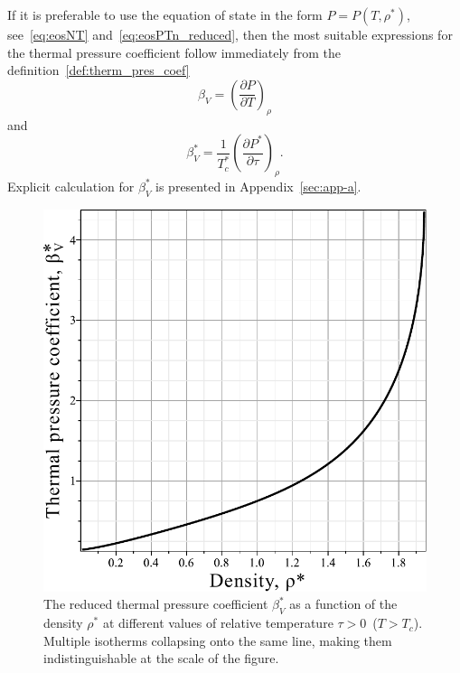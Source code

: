 \documentclass[fleqn,twoside,twocolumn,nofootinbib,showkeys]{revtex4} %
\begin{document}
	If it is preferable to use the equation of state in the form $P=P(T, \rho^*)$, see~\eqref{eq:eosNT} and~\eqref{eq:eosPTn_reduced}, then the most suitable expressions for the thermal pressure coefficient follow immediately from the definition~\eqref{def:therm_pres_coef}
	\begin{equation}
		\beta_V = \left(\frac{\partial P}{\partial T}\right)_\rho
	\end{equation}
	and
	\begin{equation}
		\label{eq:beta_star_n}
		\beta^*_V = \frac{1}{T^*_c} \left(\frac{\partial P^*}{\partial \tau}\right)_{\rho}.
	\end{equation}
	Explicit calculation for $\beta^*_V$ is presented in Appendix~\ref{sec:app-a}.
	
	\begin{figure}[h!] 
		\includegraphics[width=\column]{f3a.pdf}
		\vskip-3mm
		\caption{The reduced thermal pressure coefficient $\beta^*_V$ as a function of the density $\rho^*$ at different values of relative temperature $\tau > 0$~($T > T_c$). Multiple isotherms collapsing onto the same line, making them indistinguishable at the scale of the figure.
		}
		\label{fig3a}
	\end{figure}
\end{document}

